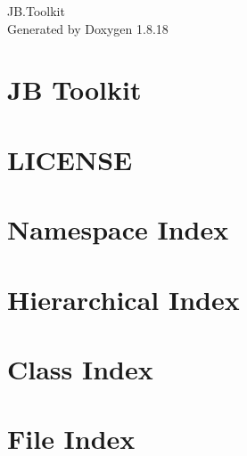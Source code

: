 \let\mypdfximage\pdfximage\def\pdfximage{\immediate\mypdfximage}\documentclass[twoside]{book}
\newcommand{\+}{\discretionary{\mbox{\scriptsize$\hookleftarrow$}}{}{}}
\newcommand{\clearemptydoublepage}{%
  \newpage{\pagestyle{empty}\cleardoublepage}%
}
\begin{document}
\hypersetup{pageanchor=false,
             bookmarksnumbered=true,
             pdfencoding=unicode
            }
\begin{titlepage}
\vspace*{7cm}
\begin{center}%
{\Large J\+B.\+Toolkit }\\
\vspace*{1cm}
{\large Generated by Doxygen 1.8.18}\\
\end{center}
\end{titlepage}
\clearemptydoublepage
{}
\tableofcontents
\clearemptydoublepage
{}
\hypersetup{pageanchor=true}

\chapter{JB Toolkit}
\label{index}\hypertarget{index}{}
\chapter{L\+I\+C\+E\+N\+SE}
\label{md__d_1__one_drive__documents__work__repositories__j_b_8_toolkit__j_b_toolkit__xml_doc__convertef6b03fdf1a971f83966b21909e6ceaf1}

\chapter{Namespace Index}

\chapter{Hierarchical Index}

\chapter{Class Index}

\chapter{File Index}

\end{document}
